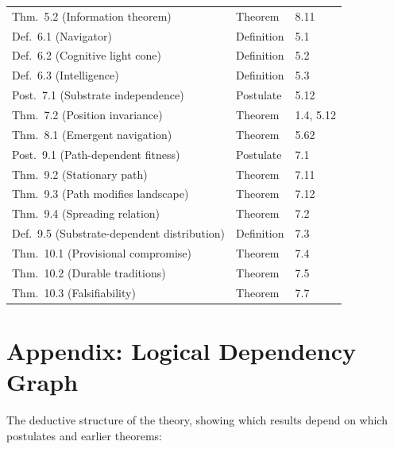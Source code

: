 \documentclass[10pt]{article}
\theoremstyle{definition}
\theoremstyle{plain}
\theoremstyle{remark}
\begin{document}
\begin{longtable}{@{}lll@{}}
Thm.~5.2 (Information theorem) & Theorem & 8.11 \\
\addlinespace
Def.~6.1 (Navigator) & Definition & 5.1 \\
Def.~6.2 (Cognitive light cone) & Definition & 5.2 \\
Def.~6.3 (Intelligence) & Definition & 5.3 \\
\addlinespace
Post.~7.1 (Substrate independence) & Postulate & 5.12 \\
Thm.~7.2 (Position invariance) & Theorem & 1.4, 5.12 \\
\addlinespace
Thm.~8.1 (Emergent navigation) & Theorem & 5.62 \\
\addlinespace
Post.~9.1 (Path-dependent fitness) & Postulate & 7.1 \\
Thm.~9.2 (Stationary path) & Theorem & 7.11 \\
Thm.~9.3 (Path modifies landscape) & Theorem & 7.12 \\
Thm.~9.4 (Spreading relation) & Theorem & 7.2 \\
Def.~9.5 (Substrate-dependent distribution) & Definition & 7.3 \\
\addlinespace
Thm.~10.1 (Provisional compromise) & Theorem & 7.4 \\
Thm.~10.2 (Durable traditions) & Theorem & 7.5 \\
Thm.~10.3 (Falsifiability) & Theorem & 7.7 \\
\end{longtable}


\newpage
\section*{Appendix: Logical Dependency Graph}

The deductive structure of the theory, showing which results depend on
which postulates and earlier theorems:
\end{document}
